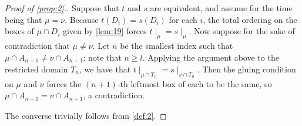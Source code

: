 \documentclass[11pt,reqno]{amsart}
\newcommand*{\restrict}[1]{{\mid}_{#1}}
\theoremstyle{definition}
\theoremstyle{problem}
\theoremstyle{plain}
\theoremstyle{remark}
\theoremstyle{theorem}
\numberwithin{equation}{section}
\numberwithin{figure}{section}
\theoremstyle{definition}
\theoremstyle{problem}
\theoremstyle{plain}
\begin{document}
\begin{proof}[Proof of \cref{prop:2}.]  
  Suppose that $t$ and $s$ are equivalent, and assume for the time
  being that $\mu = \nu$.  
  Because
  $t(D_i) = s(D_i)$ for each $i$, the total ordering on the boxes of
  $\mu \cap D_i$ given by \cref{lem:19} forces
  $t\restrict{\mu} = s\restrict{\mu}$.  Now suppose for the sake of
  contradiction that $\mu \neq \nu$.  Let $n$ be the smallest index
  such that $\mu \cap A_{n+1} \neq \nu \cap A_{n+1}$; note that
  $n \geq l$.  Applying the argument above to the restricted domain
  $T_n$, we have that
  $t\restrict{\mu \cap T_n} = s\restrict{\nu \cap T_n}$.  Then the
  gluing condition on $\mu$ and $\nu$ forces the $(n+1)$-th leftmost
  box of each to be the same, so $\mu \cap A_{n+1} = \nu \cap A_{n+1}$, a
  contradiction.

  The converse trivially follows from \cref{def:2}.
\end{proof}
\end{document}
